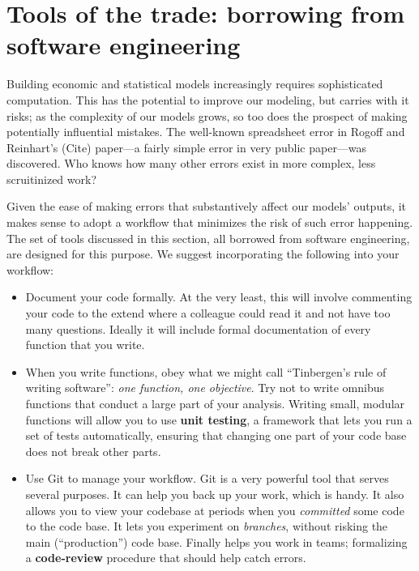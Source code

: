 \documentclass[]{book}
\providecommand{\tightlist}{%
  \setlength{\itemsep}{0pt}\setlength{\parskip}{0pt}}
\begin{document}
\section{Tools of the trade: borrowing from software
engineering}\label{tools-of-the-trade-borrowing-from-software-engineering}

Building economic and statistical models increasingly requires
sophisticated computation. This has the potential to improve our
modeling, but carries with it risks; as the complexity of our models
grows, so too does the prospect of making potentially influential
mistakes. The well-known spreadsheet error in Rogoff and Reinhart's
(Cite) paper---a fairly simple error in very public paper---was
discovered. Who knows how many other errors exist in more complex, less
scruitinized work?

Given the ease of making errors that substantively affect our models'
outputs, it makes sense to adopt a workflow that minimizes the risk of
such error happening. The set of tools discussed in this section, all
borrowed from software engineering, are designed for this purpose. We
suggest incorporating the following into your workflow:

\begin{itemize}
\tightlist
\item
  Document your code formally. At the very least, this will involve
  commenting your code to the extend where a colleague could read it and
  not have too many questions. Ideally it will include formal
  documentation of every function that you write.
\item
  When you write functions, obey what we might call ``Tinbergen's rule
  of writing software'': \emph{one function, one objective}. Try not to
  write omnibus functions that conduct a large part of your analysis.
  Writing small, modular functions will allow you to use \textbf{unit
  testing}, a framework that lets you run a set of tests automatically,
  ensuring that changing one part of your code base does not break other
  parts.
\item
  Use Git to manage your workflow. Git is a very powerful tool that
  serves several purposes. It can help you back up your work, which is
  handy. It also allows you to view your codebase at periods when you
  \emph{committed} some code to the code base. It lets you experiment on
  \emph{branches}, without risking the main (``production'') code base.
  Finally helps you work in teams; formalizing a \textbf{code-review}
  procedure that should help catch errors.
\end{itemize}
\end{document}
